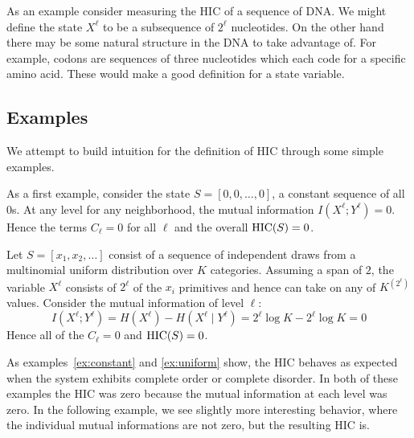 As an example consider measuring the HIC of a sequence of DNA. We might define
the state $X^\ell$ to be a subsequence of $2^\ell$ nucleotides. On the other
hand there may be some natural structure in the DNA to take advantage of. For
example, codons are sequences of three nucleotides which each code for a
specific amino acid.  These would make a good definition for a state variable.

\subsection{Examples}

We attempt to build intuition for the definition of HIC through some simple
examples.

\begin{example}
  \label{ex:constant}
  As a first example, consider the state $S = [0, 0, \ldots, 0]$,
  a constant sequence of all $0$s. At any level for any neighborhood, the mutual
  information $I(X^\ell; Y^\ell) = 0$. Hence the terms $C_\ell = 0$ for all
  $\ell$ and the overall $\textup{HIC}(S) = 0$.
\end{example}

\begin{example}
  \label{ex:uniform}
  Let $S = [x_1, x_2, \ldots]$ consist of a sequence of independent draws from a
  multinomial uniform distribution over $K$ categories. Assuming a span of $2$,
  the variable $X^\ell$ consists of $2^\ell$ of the $x_i$ primitives and hence
    can take on any of $K^{(2^\ell)}$ values. Consider the mutual information of level
  $\ell$:
  \begin{equation}
    I(X^\ell; Y^\ell) = H(X^\ell) - H(X^\ell \mid Y^{\ell}) = 2^\ell \log K - 2^\ell \log K = 0
  \end{equation}
  Hence all of the $C_\ell = 0$ and $\textup{HIC}(S) = 0$.
\end{example}

As examples~\ref{ex:constant} and \ref{ex:uniform} show, the HIC behaves as
expected when the system exhibits complete order or complete disorder. In both
of these examples the HIC was zero because the mutual information at each level
was zero. In the following example, we see slightly more interesting behavior,
where the individual mutual informations are not zero, but the resulting HIC
is.

